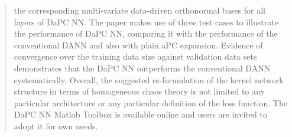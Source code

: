 \documentclass[a4paper,fleqn]{article}
\begin{document}
\begin{abstract}
the corresponding multi-variate data-driven orthonormal bases for all layers of DaPC NN. The paper makes use of three test cases to illustrate the performance of DaPC NN, comparing it with the performance of the conventional DANN and also with plain aPC expansion. Evidence of convergence over the training data size against validation data sets demonstrates that the DaPC NN outperforms the conventional DANN systematically. Overall, the suggested re-formulation of the kernel network structure in terms of homogeneous chaos theory is not limited to any particular architecture or any particular definition of the loss function. The DaPC NN Matlab Toolbox is available online and users are invited to adopt it for own needs. 
\end{abstract}








\end{document}
